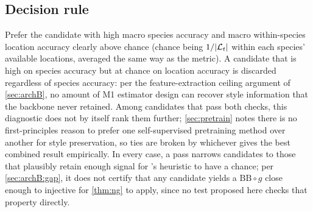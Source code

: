 \subsection{Decision rule}
\vspace{\dimexpr-\parskip+3pt\relax}
Prefer the candidate with high macro species accuracy and macro within-species location accuracy
clearly above chance (chance being $1/|\mathcal{L}_t|$ within each species' available locations, averaged
the same way as the metric). A candidate that is high on species accuracy but at chance on location
accuracy is discarded regardless of species accuracy: per the feature-extraction ceiling argument of
\cref{sec:archB}, no amount of M1 estimator design can recover style information that the backbone
never retained. Among candidates that pass both checks, this diagnostic does not by itself rank them
further; \cref{sec:pretrain} notes there is no first-principles reason to prefer one self-supervised
pretraining method over another for style preservation, so ties are broken by whichever gives the best
combined result empirically. In every case, a pass narrows candidates to those that plausibly retain
enough signal for 's heuristic to have a chance; per \cref{sec:archB:gap}, it does
not certify that any candidate yields a $\mathrm{BB}\circ g$ close enough to injective for
\cref{thm:ng} to apply, since no test proposed here checks that property directly.

